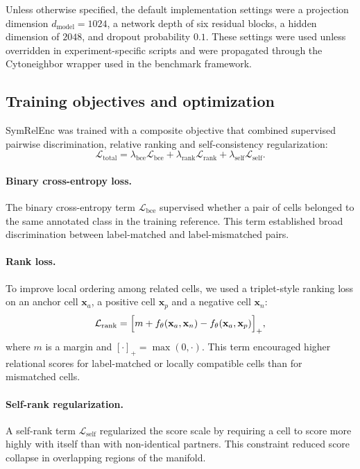 \documentclass[11pt]{article}
\begin{document}
Unless otherwise specified, the default implementation settings were a projection dimension $d_{\mathrm{model}} = 1024$, a network depth of six residual blocks, a hidden dimension of $2048$, and dropout probability $0.1$. These settings were used unless overridden in experiment-specific scripts and were propagated through the Cytoneighbor wrapper used in the benchmark framework. 

\subsection{Training objectives and optimization}

SymRelEnc was trained with a composite objective that combined supervised pairwise discrimination, relative ranking and self-consistency regularization:
\begin{equation}
\mathcal{L}_{\mathrm{total}}
=
\lambda_{\mathrm{bce}} \mathcal{L}_{\mathrm{bce}}
+
\lambda_{\mathrm{rank}} \mathcal{L}_{\mathrm{rank}}
+
\lambda_{\mathrm{self}} \mathcal{L}_{\mathrm{self}}.
\label{eq:loss_total}
\end{equation}

\paragraph{Binary cross-entropy loss.}
The binary cross-entropy term $\mathcal{L}_{\mathrm{bce}}$ supervised whether a pair of cells belonged to the same annotated class in the training reference. This term established broad discrimination between label-matched and label-mismatched pairs.

\paragraph{Rank loss.}
To improve local ordering among related cells, we used a triplet-style ranking loss on an anchor cell $\mathbf{x}_a$, a positive cell $\mathbf{x}_p$ and a negative cell $\mathbf{x}_n$:
\begin{equation}
\mathcal{L}_{\mathrm{rank}}
=
\Bigl[
m + f_{\theta}(\mathbf{x}_a,\mathbf{x}_n) - f_{\theta}(\mathbf{x}_a,\mathbf{x}_p)
\Bigr]_{+},
\label{eq:rank_loss}
\end{equation}
where $m$ is a margin and $[\cdot]_{+} = \max(0,\cdot)$. This term encouraged higher relational scores for label-matched or locally compatible cells than for mismatched cells\cite{Schroff2015FaceNet}.

\paragraph{Self-rank regularization.}
A self-rank term $\mathcal{L}_{\mathrm{self}}$ regularized the score scale by requiring a cell to score more highly with itself than with non-identical partners. This constraint reduced score collapse in overlapping regions of the manifold.
\end{document}
